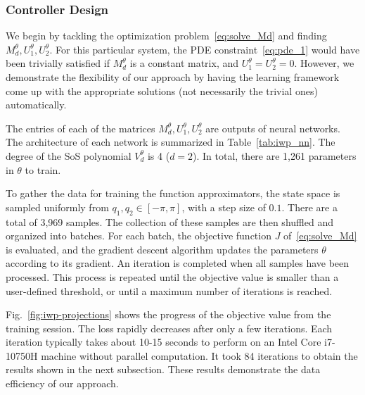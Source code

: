 \subsubsection{Controller Design}

We begin by tackling the optimization problem~\eqref{eq:solve_Md} and finding
$M_d^\theta, U_1^\theta, U_2^\theta$. For this particular system, the PDE constraint~\eqref{eq:pde_1}
would have been trivially satisfied if $M_d^\theta$ is a constant matrix, and $U_1^\theta =
U_2^\theta = 0$. However, we demonstrate the flexibility of our approach by having the
learning framework come up with the appropriate solutions (not necessarily the
trivial ones) automatically.

The entries of each of the matrices $M_d^\theta, U_1^\theta, U_2^\theta$ are
outputs of neural networks. The architecture of each network is summarized in
Table~\ref{tab:iwp_nn}. The degree of the SoS polynomial $V_d^\theta$ is 4
($d=2$). In total, there are 1,261 parameters in $\theta$ to train.

To gather the data for training the function approximators, the state space is
sampled uniformly from $q_1, q_2 \in [-\pi, \pi]$, with a step size of $0.1$.
There are a total of 3,969 samples. The collection of these samples are then
shuffled and organized into batches. For each batch, the objective function $J$
of~\eqref{eq:solve_Md} is evaluated, and the gradient descent algorithm updates
the parameters $\theta$ according to its gradient. An iteration is completed
when all samples have been processed. This process is repeated until the
objective value is smaller than a user-defined threshold, or until a maximum
number of iterations is reached.

Fig.~\ref{fig:iwp-projections} shows the progress of the objective value from
the training session. The loss rapidly decreases after only a few iterations.
Each iteration typically takes about 10-15 seconds to perform on an Intel Core
i7-10750H machine without parallel computation. It took 84 iterations to obtain
the results shown in the next subsection. These results demonstrate the data
efficiency of our approach.

